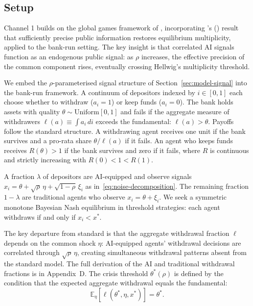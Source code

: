 \label{sec:channel1}

\subsection{Setup}

Channel 1 builds on the global games framework of \citet{morris1998, morris2002}, incorporating \citeauthor{hellwig2002}'s (\citeyear{hellwig2002}) result that sufficiently precise public information restores equilibrium multiplicity, applied to the \citet{goldstein2005} bank-run setting. The key insight is that correlated AI signals function as an endogenous public signal: as $\rho$ increases, the effective precision of the common component rises, eventually crossing Hellwig's multiplicity threshold.

We embed the $\rho$-parameterised signal structure of Section~\ref{sec:model-signal} into the \citet{goldstein2005} bank-run framework. A continuum of depositors indexed by $i \in [0,1]$ each choose whether to withdraw ($a_i = 1$) or keep funds ($a_i = 0$). The bank holds assets with quality $\theta \sim \mathrm{Uniform}[0,1]$ and fails if the aggregate measure of withdrawers $\ell(a) \equiv \int a_i \, di$ exceeds the fundamental: $\ell(a) > \theta$. Payoffs follow the standard \citet{goldstein2005} structure. A withdrawing agent receives one unit if the bank survives and a pro-rata share $\theta/\ell(a)$ if it fails. An agent who keeps funds receives $R(\theta) > 1$ if the bank survives and zero if it fails, where $R$ is continuous and strictly increasing with $R(0) < 1 < R(1)$.

A fraction $\lambda$ of depositors are AI-equipped and observe signals $x_i = \theta + \sqrt{\rho}\,\eta + \sqrt{1-\rho}\,\xi_i$ as in~\eqref{eq:noise-decomposition}. The remaining fraction $1-\lambda$ are traditional agents who observe $x_i = \theta + \xi_i$. We seek a symmetric monotone Bayesian Nash equilibrium in threshold strategies: each agent withdraws if and only if $x_i < x^*$.

The key departure from standard \citet{goldstein2005} is that the aggregate withdrawal fraction $\ell$ depends on the common shock $\eta$: AI-equipped agents' withdrawal decisions are correlated through $\sqrt{\rho}\,\eta$, creating simultaneous withdrawal patterns absent from the standard model. The full derivation of the AI and traditional withdrawal fractions is in Appendix~D. The crisis threshold $\theta^*(\rho)$ is defined by the condition that the expected aggregate withdrawal equals the fundamental:
\begin{equation}\label{eq:crisis-threshold}
  \mathbb{E}_\eta\!\left[\ell(\theta^*, \eta, x^*)\right] = \theta^*.
\end{equation}

